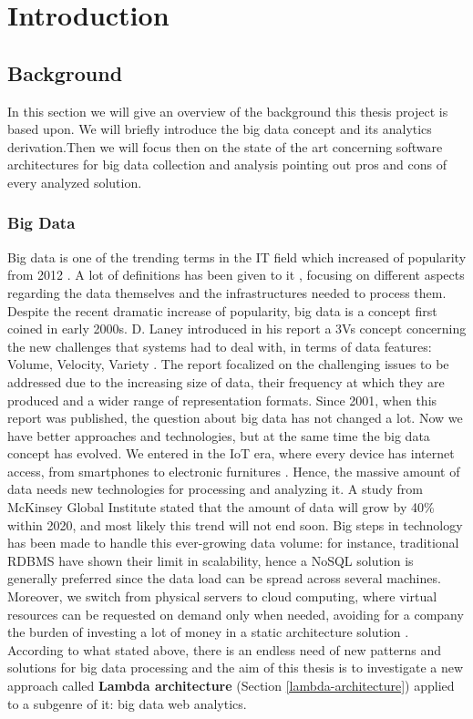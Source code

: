 \chapter{Introduction}
\label{chap:chaper1}

\section{Background}
In this section we will give an overview of the background this thesis project is based upon. We will briefly introduce the big data concept and its analytics derivation.Then we will focus then on the state of the art concerning software architectures for big data collection and analysis pointing out pros and cons of every analyzed solution. 
\subsection{Big Data}
Big data is one of the trending terms in the IT field which increased of popularity from 2012 \cite{bib10}. A lot of definitions has been given to it \cite{bib11}, focusing on different aspects regarding the data themselves and the infrastructures needed to process them.\\
Despite the recent dramatic increase of popularity, big data is a concept first coined in early 2000s. D. Laney introduced in his report a 3Vs concept concerning the new challenges that systems had to deal with, in terms of data features: Volume, Velocity, Variety \cite{bib12}. The report focalized on the challenging issues to be addressed due to the increasing size of data, their frequency at which they are produced and a wider range of representation formats. Since 2001, when this report was published, the question about big data has not changed a lot. Now we have better approaches and technologies, but at the same time the big data concept has evolved. We entered in the IoT era, where every device has internet access, from smartphones to electronic furnitures \cite{bib34}. Hence, the massive amount of data needs new technologies for processing and analyzing it. A study from McKinsey Global Institute \cite{bib17} stated that the amount of data will grow by 40\% within 2020, and most likely this trend will not end soon. Big steps in technology has been made to handle this ever-growing data volume: for instance, traditional RDBMS have shown their limit in scalability, hence a NoSQL solution is generally preferred since the data load can be spread across several machines. Moreover, we switch from physical servers to cloud computing, where virtual resources can be requested on demand only when needed, avoiding for a company the burden of investing a lot of money in a static architecture solution \cite{bib35}. According to what stated above, there is an endless need of new patterns and solutions for big data processing and the aim of this thesis is to investigate a new approach called \textbf{Lambda architecture}  (Section  \ref{lambda-architecture}) applied to a subgenre of it: big data web analytics.

